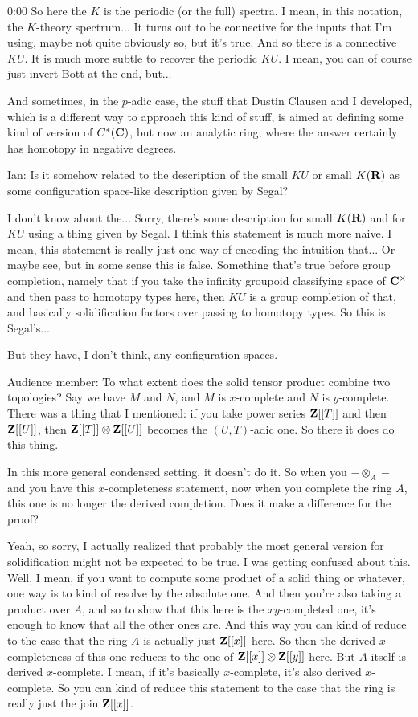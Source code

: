 \begin{unfinished}{0:00}
So here the $K$ is the periodic (or the full) spectra. I mean, in this notation, the $K$-theory spectrum... It turns out to be connective for the inputs that I'm using, maybe not quite obviously so, but it's true. And so there is a connective $KU$. It is much more subtle to recover the periodic $KU$. I mean, you can of course just invert Bott at the end, but...

And sometimes, in the $p$-adic case, the stuff that Dustin Clausen and I developed, which is a different way to approach this kind of stuff, is aimed at defining some kind of version of $C^*(\mathbf C)$, but now an analytic ring, where the answer certainly has homotopy in negative degrees.

Ian: Is it somehow related to the description of the small $KU$ or small $K(\mathbf R)$ as some configuration space-like description given by Segal?

I don't know about the... Sorry, there's some description for small $K(\mathbf R)$ and for $KU$ using a thing given by Segal. I think this statement is much more naive. I mean, this statement is really just one way of encoding the intuition that... Or maybe see, but in some sense this is false. Something that's true before group completion, namely that if you take the infinity groupoid classifying space of $\mathbf C^\times$ and then pass to homotopy types here, then $KU$ is a group completion of that, and basically solidification factors over passing to homotopy types. So this is Segal's...

But they have, I don't think, any configuration spaces.

Audience member: To what extent does the solid tensor product combine two topologies? Say we have $M$ and $N$, and $M$ is $x$-complete and $N$ is $y$-complete. There was a thing that I mentioned: if you take power series $\mathbf Z[[T]]$ and then $\mathbf Z[[U]]$, then $\mathbf Z[[T]] \otimes \mathbf Z[[U]]$ becomes the $(U,T)$-adic one. So there it does do this thing.

In this more general condensed setting, it doesn't do it. So when you $-\otimes_A-$ and you have this $x$-completeness statement, now when you complete the ring $A$, this one is no longer the derived completion. Does it make a difference for the proof?

Yeah, so sorry, I actually realized that probably the most general version for solidification might not be expected to be true. I was getting confused about this. Well, I mean, if you want to compute some product of a solid thing or whatever, one way is to kind of resolve by the absolute one. And then you're also taking a product over $A$, and so to show that this here is the $xy$-completed one, it's enough to know that all the other ones are. And this way you can kind of reduce to the case that the ring $A$ is actually just $\mathbf Z[[x]]$ here. So then the derived $x$-completeness of this one reduces to the one of $\mathbf Z[[x]] \otimes \mathbf Z[[y]]$ here. But $A$ itself is derived $x$-complete. I mean, if it's basically $x$-complete, it's also derived $x$-complete. So you can kind of reduce this statement to the case that the ring is really just the join $\mathbf Z[[x]]$.


\end{unfinished}
